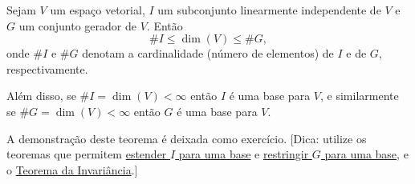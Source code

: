 \begin{theorem}
	Sejam $V$ um espaço vetorial, $I$ um subconjunto linearmente independente de $V$ e $G$ um conjunto gerador de $V$. Então
	\[\#I\leq\dim(V)\leq\#G,\]
	onde $\#I$ e $\#G$ denotam a cardinalidade (número de elementos) de $I$ e de $G$, respectivamente.
	
	Além disso, se $\#I=\dim(V)<\infty$ então $I$ é uma base para $V$, e similarmente se $\#G=\dim(V)<\infty$ então $G$ é uma base para $V$.
\end{theorem}

A demonstração deste teorema é deixada como exercício. [Dica: utilize os teoremas que permitem \href{http://mtm.ufsc.br/~cordeiro/ensino/mtm3112.algebra.linear/06.bases/teo_li_estende_para_base_moodle.html}{estender $I$ para uma base} e \href{http://mtm.ufsc.br/~cordeiro/ensino/mtm3112.algebra.linear/06.bases/teo_gerador_restringe_para_base_moodle.html}{restringir $G$ para uma base}, e o \href{http://mtm.ufsc.br/~cordeiro/ensino/mtm3112.algebra.linear/06.bases/teo_da_invariancia_moodle.html}{Teorema da Invariância}.]